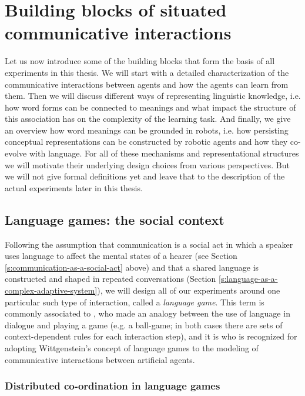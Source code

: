 
\setcounter{chapter}{1}

\chapter{Building blocks of situated communicative interactions}
\label{c:building-blocks}

Let us now introduce some of the building blocks that form the basis
of all experiments in this thesis. We will start with a detailed
characterization of the communicative interactions between agents and
how the agents can learn from them. Then we will discuss different
ways of representing linguistic knowledge, i.e. how word forms can be
connected to meanings and what impact the structure of this
association has on the complexity of the learning task. And finally,
we give an overview how word meanings can be grounded in robots, i.e.
how persisting conceptual representations can be constructed by
robotic agents and how they co-evolve with language. For all of these
mechanisms and representational structures we will motivate their
underlying design choices from various perspectives. But we will not
give formal definitions yet and leave that to the description of the
actual experiments later in this thesis.


\section{Language games: the social context}


Following the assumption that communication is a social act in which a
speaker uses language to affect the mental states of a hearer (see
Section \ref{s:communication-as-a-social-act} above) and that a shared
language is constructed and shaped in repeated conversations (Section
\ref{s:language-as-a-complex-adaptive-system}), we will design all of
our experiments around one particular such type of interaction, called
a \emph{language game}. This term is commonly associated to
\cite{wittgenstein67philosophische}, who made an analogy between the
use of language in dialogue and playing a game (e.g. a ball-game; in
both cases there are sets of context-dependent rules for each
interaction step), and it is
\cite{steels95selforganizing,steels01language} who is recognized for
adopting Wittgenstein's concept of language games to the modeling of
communicative interactions between artificial agents.



\subsection{Distributed co-ordination in language games}
\label{s:language-game}

